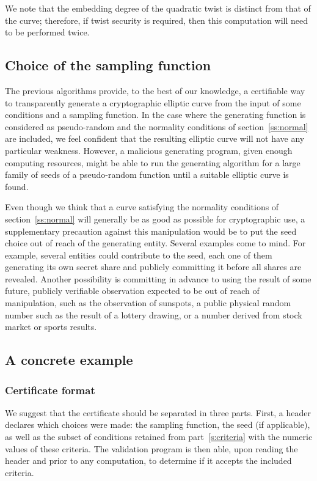 \documentclass[twocolumn,letterpaper,10pt]{article}
\begin{document}
We note that the embedding degree of the quadratic twist
is distinct from that of the curve;
therefore, if twist security is required,
then this computation will need to be performed twice.

\subsection{Choice of the sampling function}

The previous algorithms provide, to the best of our knowledge,
a certifiable way to transparently generate a cryptographic elliptic curve
from the input of some conditions and a sampling function.
In the case where the generating function is considered as pseudo-random
and the normality conditions of section~\ref{ss:normal} are included,
we feel confident that the resulting elliptic curve
will not have any particular weakness.
However, a malicious generating program, given enough computing resources,
might be able to run the generating algorithm
for a large family of seeds of a pseudo-random function
until a suitable elliptic curve is found.

Even though we think that a curve satisfying the normality conditions
of section~\ref{ss:normal} will generally be as good as possible
for cryptographic use,
a supplementary precaution against this manipulation
would be to put the seed choice out of reach of the generating entity.
Several examples come to mind.
For example, several entities could contribute to the seed,
each one of them generating its own secret share
and publicly committing it before all shares are revealed.
Another possibility is committing in advance to using
the result of some future, publicly verifiable observation
expected to be out of reach of manipulation,
such as the observation of sunspots,
a public physical random number such as the result of a lottery drawing,
or a number derived from stock market or sports results.

\subsection{A concrete example}

\subsubsection{Certificate format}

We suggest that the certificate should be separated in three parts.
First, a header declares which choices were made:
the sampling function, the seed (if applicable),
as well as the subset of conditions retained from part~\ref{s:criteria}
with the numeric values of these criteria.
The validation program is then able,
upon reading the header and prior to any computation,
to determine if it accepts the included criteria.
\end{document}
